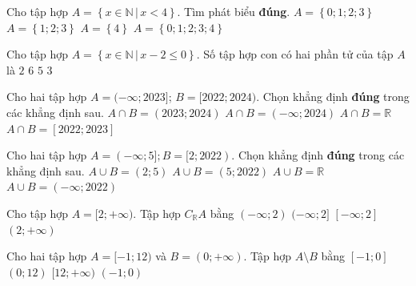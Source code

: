 \begin{ex}%
Cho tập hợp $A=\left\{x \in \mathbb{N}\,|\, x<4\right\}$. Tìm phát biểu \textbf{đúng}.
	\choice
	{\True $A=\left\{0;1;2;3\right\}$}
	{$A=\left\{1;2;3\right\}$}
	{$A=\left\{4\right\}$}
	{$A=\left\{0;1;2;3;4\right\}$}
\end{ex}

\begin{ex}%
	Cho tập hợp $A=\left\{x \in \mathbb{N}\,|\, x-2\leq 0\right\}$. Số tập hợp con có hai phần tử của tập $A$ là
	\choice
	{$2$}
	{$6$}
	{$5$}
	{\True $3$}
\end{ex}

\begin{ex}%
Cho hai tập hợp $A=(-\infty ; 2023]$; $B=[2022 ; 2024)$. Chọn khẳng định \textbf{đúng} trong các khẳng định sau.
\choice
{$A \cap B=(2023 ; 2024)$}
{$A \cap B=(-\infty ; 2024)$}
{$A \cap B=\mathbb{R}$}
{\True $A \cap B=[2022 ; 2023]$}
\end{ex}

\begin{ex}%
Cho hai tập hợp $A=(-\infty ; 5] ; B=[2 ; 2022)$. Chọn khẳng định \textbf{đúng} trong các khẳng định sau.
\choice
{$A \cup B=(2 ; 5)$}
 {$A \cup B=(5 ; 2022)$}
{$A \cup B=\mathbb{R}$}
{$A \cup B=(-\infty ; 2022)$}
\end{ex}

\begin{ex}%
Cho tập hợp $A=[2 ;+\infty)$. Tập hợp $C_{\mathbb{R}} A$ bằng
	\choice
{\True $(-\infty ; 2)$}
{$(-\infty ; 2]$}
{$[-\infty ; 2]$}
{$(2 ;+\infty)$}
\end{ex}

\begin{ex}%
Cho hai tập hợp $A=[-1 ; 12)$ và $B=(0 ;+\infty)$. Tập hợp $A \setminus B$ bằng
\choice
{\True $[-1 ; 0]$}
{$(0 ; 12)$}
{$[12 ;+\infty)$}
{$(-1 ; 0)$}
\end{ex}

